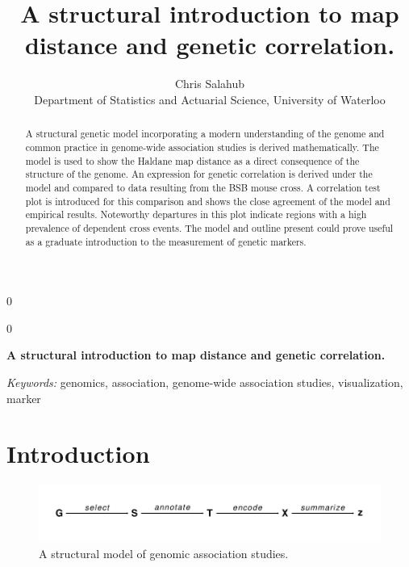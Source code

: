 \documentclass[12pt]{article}
\newcommand{\blind}{0}
\begin{document}
%

\def\spacingset#1{\renewcommand{\baselinestretch}%
{#1}\small\normalsize} \spacingset{1}



\blind
{
  \title{\bf A structural introduction to map distance and genetic correlation.}
  \author{Chris Salahub\hspace{.2cm}\\
    Department of Statistics and Actuarial Science, University of Waterloo}
  \maketitle
} \fi

\blind
{
  \bigskip
  \bigskip
  \bigskip
  \begin{center}
    {\LARGE\bf A structural introduction to map distance and genetic correlation.}
\end{center}
  \medskip
} \fi

\bigskip
\begin{abstract}
A structural genetic model incorporating a modern understanding of the genome and common practice in genome-wide association studies is derived mathematically. The model is used to show the Haldane map distance as a direct consequence of the structure of the genome. An expression for genetic correlation is derived under the model and compared to data resulting from the BSB mouse cross. A correlation test plot is introduced for this comparison and shows the close agreement of the model and empirical results. Noteworthy departures in this plot indicate regions with a high prevalence of dependent cross events. The model and outline present could prove useful as a graduate introduction to the measurement of genetic markers.
\end{abstract}

\noindent%
{\it Keywords:}  genomics, association, genome-wide association studies, visualization, marker
\vfill

\newpage
\spacingset{1.45} %
\section{Introduction} \label{sec:intro}

\begin{figure}[h]
  \begin{center}
    \includegraphics[scale = 1]{../img/modelDiagram.pdf}
    \caption{A structural model of genomic association studies. \label{fig:modelDiagram}}
  \end{center}
\end{figure}
\end{document}
